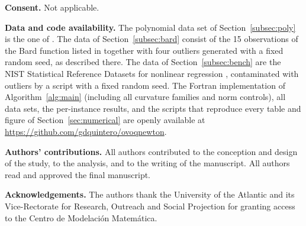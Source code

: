 \documentclass[11pt]{article}
\newcounter{alg}[section]
\begin{document}
\medskip
\noindent
\textbf{Consent.} Not applicable.

\medskip
\noindent
\textbf{Data and code availability.} The polynomial data set of Section~\ref{subsec:poly} is the one of \cite{dunder1}. The data of Section~\ref{subsec:bard} consist of the 15 observations of the Bard function listed in \cite{mgh} together with four outliers generated with a fixed random seed, as described there. The data of Section~\ref{subsec:bench} are the NIST Statistical Reference Datasets for nonlinear regression \cite{nist}, contaminated with outliers by a script with a fixed random seed. The Fortran implementation of Algorithm~\ref{alg:main} (including all curvature families and norm controls), all data sets, the per-instance results, and the scripts that reproduce every table and figure of Section~\ref{sec:numerical} are openly available at \url{https://github.com/gdquintero/ovoqnewton}.

\medskip
\noindent
\textbf{Authors' contributions.} All authors contributed to the conception and design of the study, to the analysis, and to the writing of the manuscript. All authors read and approved the final manuscript.

\medskip
\noindent
\textbf{Acknowledgements.} The authors thank the University of the Atlantic and its Vice-Rectorate for Research, Outreach and Social Projection for granting access to the Centro de Modelación Matemática.

\clearpage
\end{document}
